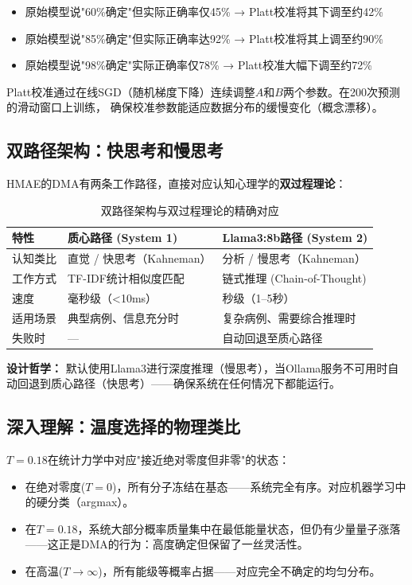 \documentclass[11pt,a4paper]{ctexart}
\begin{document}
\begin{itemize}[nosep]
\item 原始模型说"60\%确定"但实际正确率仅45\% → Platt校准将其下调至约42\%
\item 原始模型说"85\%确定"但实际正确率达92\% → Platt校准将其上调至约90\%
\item 原始模型说"98\%确定"实际正确率仅78\% → Platt校准大幅下调至约72\%
\end{itemize}

Platt校准通过在线SGD（随机梯度下降）连续调整$A$和$B$两个参数。在200次预测的滑动窗口上训练，
确保校准参数能适应数据分布的缓慢变化（概念漂移）。



\subsection{双路径架构：快思考和慢思考}

HMAE的DMA有两条工作路径，直接对应认知心理学的\textbf{双过程理论}：

\begin{table}[H]
\centering
\small
\begin{tabular}{p{2.2cm}p{5.5cm}p{5.5cm}}
\toprule
\textbf{特性} & \textbf{质心路径 (System 1)} & \textbf{Llama3:8b路径 (System 2)} \\
\midrule
认知类比 & 直觉 / 快思考（Kahneman） & 分析 / 慢思考（Kahneman） \\
工作方式 & TF-IDF统计相似度匹配 & 链式推理 (Chain-of-Thought) \\
速度 & 毫秒级（<10ms） & 秒级（1--5秒） \\
适用场景 & 典型病例、信息充分时 & 复杂病例、需要综合推理时 \\
失败时 & — & 自动回退至质心路径 \\
\bottomrule
\end{tabular}
\caption{双路径架构与双过程理论的精确对应}
\end{table}

\textbf{设计哲学：} 默认使用Llama3进行深度推理（慢思考），当Ollama服务不可用时自动回退到质心路径（快思考）——确保系统在任何情况下都能运行。

\subsection{深入理解：温度选择的物理类比}

$T=0.18$在统计力学中对应"接近绝对零度但非零"的状态：
\begin{itemize}[nosep]
\item 在绝对零度($T=0$)，所有分子冻结在基态——系统完全有序。对应机器学习中的硬分类（argmax）。
\item 在$T=0.18$，系统大部分概率质量集中在最低能量状态，但仍有少量量子涨落——这正是DMA的行为：高度确定但保留了一丝灵活性。
\item 在高温($T \to \infty$)，所有能级等概率占据——对应完全不确定的均匀分布。
\end{itemize}
\end{document}
